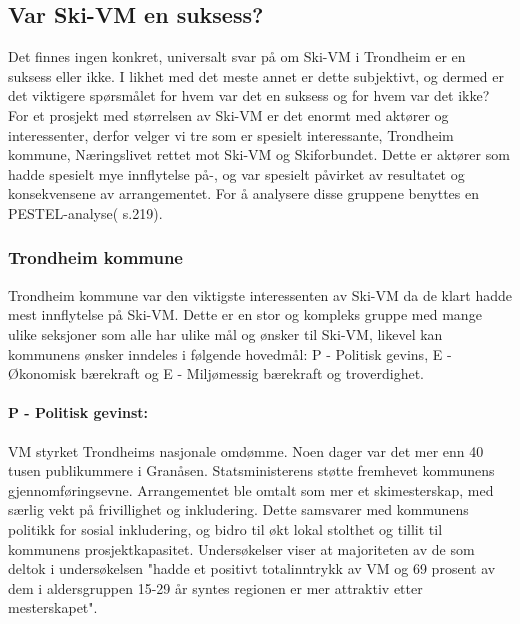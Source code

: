 \subsection{Var Ski-VM en suksess?}
Det finnes ingen konkret, universalt svar på om Ski-VM i Trondheim er en suksess eller ikke.
I likhet med det meste annet er dette subjektivt, og dermed er det viktigere spørsmålet for hvem
var det en suksess og for hvem var det ikke? For et prosjekt med størrelsen av Ski-VM er det
enormt med aktører og interessenter, derfor velger vi tre som er spesielt interessante,
Trondheim kommune, Næringslivet rettet mot Ski-VM og Skiforbundet. Dette er aktører som hadde
spesielt mye innflytelse på-, og var spesielt påvirket av resultatet og konsekvensene av
arrangementet. For å analysere disse gruppene benyttes en PESTEL-analyse(\cite{Teknologiledelse} s.219).

\subsubsection{Trondheim kommune}
Trondheim kommune var den viktigste interessenten av Ski-VM da de klart hadde mest
innflytelse på Ski-VM. Dette er en stor og kompleks gruppe med mange ulike seksjoner som
alle har ulike mål og ønsker til Ski-VM, likevel kan kommunens ønsker inndeles i
følgende hovedmål: P - Politisk gevins, E - Økonomisk bærekraft og E - Miljømessig bærekraft og troverdighet.


\paragraph{P - Politisk gevinst:} VM styrket Trondheims nasjonale omdømme. Noen dager var det mer enn 40 tusen publikummere i 
Granåsen\cite{NRKFolkefest}. Statsministerens støtte fremhevet kommunens 
gjennomføringsevne\cite{Trondheim2025Midler}. 
Arrangementet ble omtalt som mer et skimesterskap, med særlig vekt på frivillighet og 
inkludering\cite{Trondheim2025Baerekraft}.  Dette samsvarer med kommunens politikk for sosial inkludering, 
og bidro til økt lokal stolthet og tillit til kommunens prosjektkapasitet. Undersøkelser viser
at majoriteten av de som deltok i undersøkelsen "hadde et positivt totalinntrykk av VM og 69 prosent
av dem i aldersgruppen 15-29 år syntes regionen er mer attraktiv etter mesterskapet"\cite{AftenpostenNyVM}.

